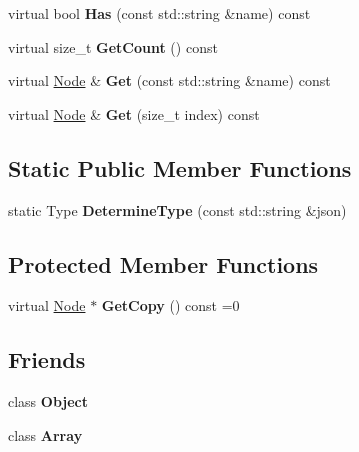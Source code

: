 \begin{DoxyCompactItemize}
\item 
\hypertarget{class_jzon_1_1_node_a33bdf9e328586d5a52ac8f86f7817134}{virtual bool {\bfseries Has} (const std\-::string \&name) const }\label{class_jzon_1_1_node_a33bdf9e328586d5a52ac8f86f7817134}

\item 
\hypertarget{class_jzon_1_1_node_a625d10ba056e724fbd3e06566d80e567}{virtual size\-\_\-t {\bfseries Get\-Count} () const }\label{class_jzon_1_1_node_a625d10ba056e724fbd3e06566d80e567}

\item 
\hypertarget{class_jzon_1_1_node_a879db6f0a36e34fe28916da41afef8c6}{virtual \hyperlink{class_jzon_1_1_node}{Node} \& {\bfseries Get} (const std\-::string \&name) const }\label{class_jzon_1_1_node_a879db6f0a36e34fe28916da41afef8c6}

\item 
\hypertarget{class_jzon_1_1_node_a3acef30b1ced9998de455a7ec4005f03}{virtual \hyperlink{class_jzon_1_1_node}{Node} \& {\bfseries Get} (size\-\_\-t index) const }\label{class_jzon_1_1_node_a3acef30b1ced9998de455a7ec4005f03}

\end{DoxyCompactItemize}
\subsection*{Static Public Member Functions}
\begin{DoxyCompactItemize}
\item 
\hypertarget{class_jzon_1_1_node_afcdb671ccea4b131592a393af3b1a250}{static Type {\bfseries Determine\-Type} (const std\-::string \&json)}\label{class_jzon_1_1_node_afcdb671ccea4b131592a393af3b1a250}

\end{DoxyCompactItemize}
\subsection*{Protected Member Functions}
\begin{DoxyCompactItemize}
\item 
\hypertarget{class_jzon_1_1_node_ac396a4b711b5731ecf26728a78af72fd}{virtual \hyperlink{class_jzon_1_1_node}{Node} $\ast$ {\bfseries Get\-Copy} () const =0}\label{class_jzon_1_1_node_ac396a4b711b5731ecf26728a78af72fd}

\end{DoxyCompactItemize}
\subsection*{Friends}
\begin{DoxyCompactItemize}
\item 
\hypertarget{class_jzon_1_1_node_a0720b5f434e636e22a3ed34f847eec57}{class {\bfseries Object}}\label{class_jzon_1_1_node_a0720b5f434e636e22a3ed34f847eec57}

\item 
\hypertarget{class_jzon_1_1_node_ae5050cd67e450419cf638e2a09bf11c9}{class {\bfseries Array}}\label{class_jzon_1_1_node_ae5050cd67e450419cf638e2a09bf11c9}

\end{DoxyCompactItemize}


